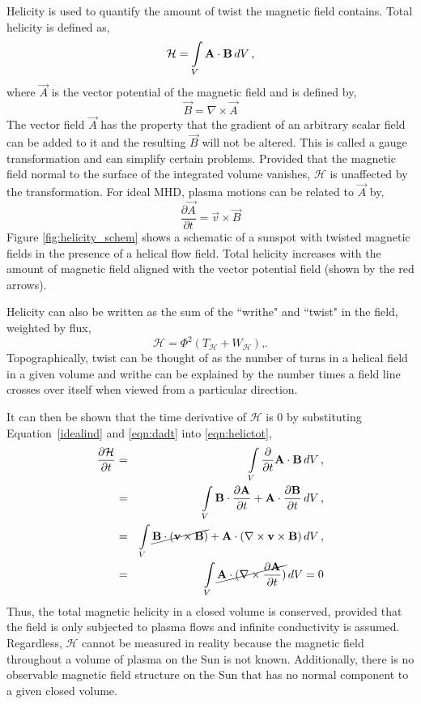 Helicity is used to quantify the amount of twist the magnetic field contains. Total helicity is defined as,
\begin{equation}\label{eqn:helictot}
\mathcal{H} = \int \limits_V \vec{A}\cdot\vec{B}\,dV \mbox{\,,}
\end{equation}
where $\vec{A}$ is the vector potential of the magnetic field and is defined by,
\begin{equation}
\vec{B}=\nabla \times \vec{A}  
\end{equation}
The vector field $\vec{A}$ has the property that the gradient of an arbitrary scalar field can be added to it and the resulting $\vec{B}$ will not be altered. This is called a gauge transformation and can simplify certain problems. Provided that the magnetic field normal to the surface of the integrated volume vanishes, $\mathcal{H}$ is unaffected by the transformation. 
For ideal \gls{MHD}, plasma motions can be related to $\vec{A}$ by,
\begin{equation}\label{eqn:dadt}
\frac{\partial \vec{A}}{\partial t} = \vec{v} \times \vec{B}  
\end{equation}
Figure \ref{fig:helicity_schem} shows a schematic of a sunspot with twisted magnetic fields in the presence of a helical flow field. Total helicity increases with the amount of magnetic field aligned with the vector potential field (shown by the red arrows).

Helicity can also be written as the sum of the ``writhe" and ``twist" in the field, weighted by flux,
\begin{equation}
\mathcal{H} = \Phi^2 (T_{\mathcal{H}}+W_{\mathcal{H}})\mbox{,.}
\end{equation}
Topographically, twist can be thought of as the number of turns in a helical field in a given volume and writhe can be explained by the number times a field line crosses over itself when viewed from a particular direction.

It can then be shown that the time derivative of $\mathcal{H}$ is 0 by substituting Equation~\ref{idealind} and \ref{eqn:dadt} into \ref{eqn:helictot},
\begin{eqnarray}
\frac{\partial \mathcal{H}}{\partial t} &=& \int \limits_V \frac{\partial}{\partial t} \vec{A}\cdot\vec{B}\,dV \mbox{\,,} \\
 &=& \int \limits_V \vec{B}\cdot\frac{\partial \vec{A}}{\partial t} + \vec{A}\cdot\frac{\partial \vec{B}}{\partial t}\,dV \mbox{\,,} \\
 &=& \int \limits_V \cancel{\vec{B}\cdot (\vec{v}\times\vec{B})} + \vec{A}\cdot (\nabla \times \vec{v} \times \vec{B})\,dV \mbox{\,,} \\
 &=& \int \limits_V \cancel{\vec{A}\cdot (\nabla \times \frac{\partial \vec{A}}{\partial t})}\,dV = 0  
\end{eqnarray}
Thus, the total magnetic helicity in a closed volume is conserved, provided that the field is only subjected to plasma flows and infinite conductivity is assumed. Regardless, $\mathcal{H}$ cannot be measured in reality because the magnetic field throughout a volume of plasma on the Sun is not known. Additionally, there is no observable magnetic field structure on the Sun that has no normal component to a given closed volume.

